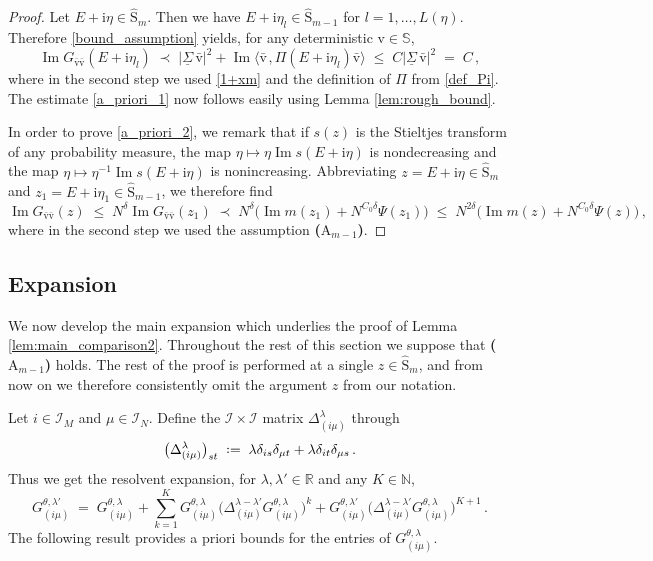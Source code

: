 \documentclass[11pt]{article} %
\numberwithin{equation}{section}
\numberwithin{figure}{section}
\theoremstyle{plain} %
\theoremstyle{definition} %
\newcommand{\f}[1]{\boldsymbol{\mathrm{#1}}} %
\newcommand{\bb}{\mathbb} %
\renewcommand{\cal}{\mathcal}
\newcommand{\ul}[1]{\underline{#1} \!\,} %
\newcommand{\wh}{\widehat}
\newcommand{\R}{\mathbb{R}}
\newcommand{\N}{\mathbb{N}}
\newcommand{\ii}{\mathrm{i}}
\newcommand*{\deq}{\mathrel{\vcenter{\baselineskip0.65ex \lineskiplimit0pt \hbox{.}\hbox{.}}}=}
\renewcommand{\leq}{\leqslant}
\newcommand{\pb}[1]{\bigl({#1}\bigr)}
\newcommand{\abs}[1]{\lvert #1 \rvert}
\newcommand{\scalarb}[2]{\bigl\langle{#1} \mspace{2mu}, {#2}\bigr\rangle}
\DeclareMathOperator{\im}{Im}
\begin{document}
\begin{proof}
Let $E + \ii \eta \in \wh {\f S}_m$. Then we have $E + \ii \eta_l \in \wh{\f S}_{m - 1}$ for $l = 1, \dots, L(\eta)$. Therefore \eqref{bound_assumption} yields, for any deterministic $\f v \in \bb S$,
\begin{equation*}
\im G_{\bar {\f v} \bar {\f v}}(E + \ii \eta_l) \;\prec\; \abs{\ul \Sigma \bar {\f v}}^2 + \im \scalarb{\bar {\f v}}{\Pi(E + \ii \eta_l) \bar {\f v}} \;\leq\; C \abs{\ul \Sigma \bar {\f v}}^2 \;=\; C\,,
\end{equation*}
where in the second step we used \eqref{1+xm} and the definition of $\Pi$ from \eqref{def_Pi}. The estimate \eqref{a_priori_1} now follows easily using Lemma \ref{lem:rough_bound}.

In order to prove \eqref{a_priori_2}, we remark that if $s(z)$ is the Stieltjes transform of any probability measure, the map $\eta \mapsto \eta \im s(E + \ii \eta)$ is nondecreasing and the map $\eta \mapsto \eta^{-1} \im s(E + \ii \eta)$ is nonincreasing. Abbreviating $z = E + \ii \eta \in \wh{\f S}_m$ and $z_1 = E + \ii \eta_1 \in \wh{\f S}_{m-1}$, we therefore find
\begin{equation*}
\im G_{\bar {\f v} \bar {\f v}}(z) \;\leq\; N^\delta \im G_{\bar {\f v} \bar {\f v}}(z_1) \;\prec\; N^\delta \pb{\im m(z_1) + N^{C_0 \delta} \Psi(z_1)} \;\leq\;  N^{2 \delta} \pb{\im m(z) + N^{C_0 \delta} \Psi(z)}\,,
\end{equation*}
where in the second step we used the assumption \textbf{($\f A_{m - 1}$)}.
\end{proof}

\subsection{Expansion} \label{sec:expansion}
We now develop the main expansion which underlies the proof of Lemma \ref{lem:main_comparison2}. Throughout the rest of this section we suppose that \textbf{($\f A_{m - 1}$)} holds. The rest of the proof is performed at a single $z \in \wh{\f S}_m$, and from now on we therefore consistently omit the argument $z$ from our notation.

Let $i \in \cal I_M$ and $\mu \in \cal I_N$. Define the $\cal I \times \cal I$ matrix $\Delta^\lambda_{(i \mu)}$ through
\begin{equation*}
\pb{\Delta^\lambda_{(i \mu)}}_{st} \;\deq\; \lambda \delta_{i s} \delta_{\mu t} + \lambda \delta_{it} \delta_{\mu s}\,.
\end{equation*}
Thus we get the resolvent expansion, for $\lambda, \lambda' \in \R$ and any $K \in \N$,
\begin{equation} \label{res_exp}
G^{\theta,\lambda'}_{(i \mu)} \;=\; G^{\theta,\lambda}_{(i \mu)} + \sum_{k = 1}^K G^{\theta,\lambda}_{(i \mu)} \pb{\Delta_{(i \mu)}^{\lambda - \lambda'} G^{\theta,\lambda}_{(i \mu)}}^k + G^{\theta,\lambda'}_{(i \mu)} \pb{\Delta_{(i \mu)}^{\lambda - \lambda'} G^{\theta, \lambda}_{(i \mu)}}^{K+1}\,.
\end{equation}
The following result provides a priori bounds for the entries of $G^{\theta,\lambda}_{(i \mu)}$.
\end{document}
